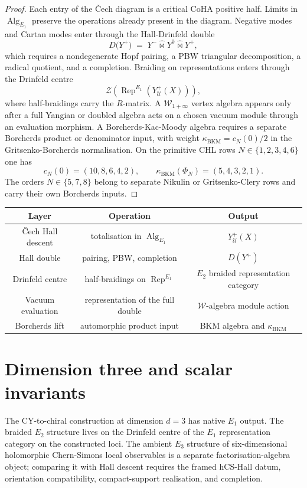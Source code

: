 \documentclass[11pt]{article}
\providecommand{\cU}{\mathcal{U}}
\providecommand{\Rep}{\operatorname{Rep}}
\providecommand{\Alg}{\operatorname{Alg}}
\theoremstyle{definition}
\theoremstyle{remark}
\begin{document}
\begin{proof}
Each entry of the \v{C}ech diagram is a critical CoHA positive half.
Limits in $\Alg_{E_1}$ preserve the operations already present in the
diagram. Negative modes and Cartan modes
enter through the Hall-Drinfeld double
\[
D\bigl(Y^+\bigr)
\;=\;
Y^-\widehat{\bowtie}Y^0\widehat{\bowtie}Y^+,
\]
which requires a nondegenerate Hopf pairing, a PBW triangular
decomposition, a radical quotient, and a completion. Braiding on
representations enters
through the Drinfeld centre
\[
\mathcal Z\!\left(\Rep^{E_1}(Y^+_{\cU}(X))\right),
\]
where half-braidings carry the $R$-matrix. A
$\mathcal W_{1+\infty}$ vertex algebra appears only after a full
Yangian or doubled algebra acts on a chosen vacuum module through an
evaluation morphism. A Borcherds-Kac-Moody algebra requires a separate
Borcherds product or denominator input, with weight
$\kappa_{\mathrm{BKM}}=c_N(0)/2$ in the Gritsenko-Borcherds
normalisation. On the primitive CHL rows $N\in\{1,2,3,4,6\}$ one has
\[
c_N(0)=(10,8,6,4,2),\qquad
\kappa_{\mathrm{BKM}}(\Phi_N)=(5,4,3,2,1).
\]
The orders $N\in\{5,7,8\}$ belong to separate Nikulin or
Gritsenko-Clery rows and carry their own Borcherds inputs.
\end{proof}

\begin{center}
\begin{tabular}{c|c|c}
Layer & Operation & Output \\
\hline
\v{C}ech Hall descent & totalisation in $\Alg_{E_1}$ &
$Y^+_{\cU}(X)$ \\
Hall double & pairing, PBW, completion &
$D(Y^+)$ \\
Drinfeld centre & half-braidings on $\Rep^{E_1}$ &
$E_2$ braided representation category \\
Vacuum evaluation & representation of the full double &
$\mathcal W$-algebra module action \\
Borcherds lift & automorphic product input &
BKM algebra and $\kappa_{\mathrm{BKM}}$
\end{tabular}
\end{center}

\section{Dimension three and scalar invariants}

The CY-to-chiral construction at dimension $d=3$ has native
$E_1$ output. The braided $E_2$ structure lives on the Drinfeld centre
of the $E_1$ representation category on the constructed loci. The
ambient $E_3$ structure of six-dimensional holomorphic Chern-Simons
local observables is a separate factorisation-algebra object; comparing
it with Hall descent requires the framed hCS-Hall datum, orientation
compatibility, compact-support realisation, and completion.
\end{document}
